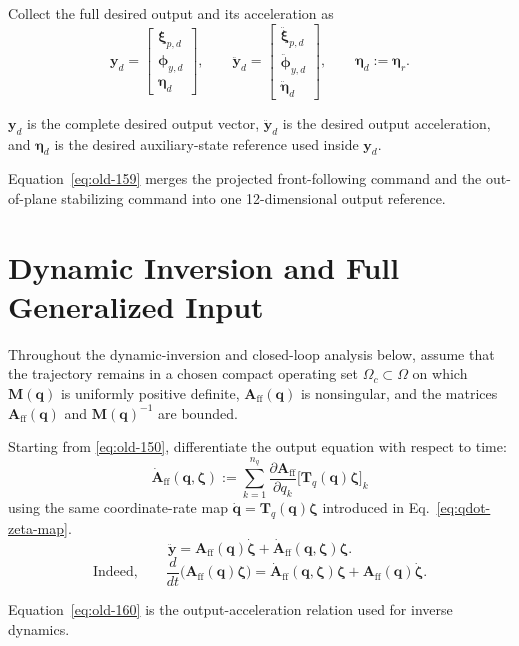 \documentclass[12pt,a4paper]{report}
\newcommand{\newsymbols}[1]{\par\noindent{}#1\par\vspace{0.35em}}
\newcommand{\formulaannotation}[1]{\par\noindent{}#1\par\vspace{0.35em}}
\begin{document}
Collect the full desired output and its acceleration as
\begin{equation}
\mathbf{y}_d =
\begin{bmatrix}
\boldsymbol{\xi}_{p,d} \\
\boldsymbol{\phi}_{y,d} \\
\boldsymbol{\eta}_d
\end{bmatrix},
\qquad
\ddot{\mathbf{y}}_d =
\begin{bmatrix}
\ddot{\boldsymbol{\xi}}_{p,d} \\
\ddot{\boldsymbol{\phi}}_{y,d} \\
\ddot{\boldsymbol{\eta}}_d
\end{bmatrix},
\qquad
\boldsymbol{\eta}_d := \boldsymbol{\eta}_r.
\label{eq:old-159}
\end{equation}
\newsymbols{$\mathbf{y}_d$ is the complete desired output vector, $\ddot{\mathbf{y}}_d$ is the desired output acceleration, and $\boldsymbol{\eta}_d$ is the desired auxiliary-state reference used inside $\mathbf{y}_d$.}
\formulaannotation{Equation~\eqref{eq:old-159} merges the projected front-following command and the out-of-plane stabilizing command into one 12-dimensional output reference.}

\section{Dynamic Inversion and Full Generalized Input}

Throughout the dynamic-inversion and closed-loop analysis below, assume that the trajectory remains in a chosen compact operating set $\Omega_c \subset \Omega$ on which $\mathbf{M}(\mathbf{q})$ is uniformly positive definite, $\mathbf{A}_{\mathrm{ff}}(\mathbf{q})$ is nonsingular, and the matrices $\mathbf{A}_{\mathrm{ff}}(\mathbf{q})$ and $\mathbf{M}(\mathbf{q})^{-1}$ are bounded.

Starting from \eqref{eq:old-150}, differentiate the output equation with respect to time:
\begin{equation}
\dot{\mathbf{A}}_{\mathrm{ff}}(\mathbf{q},\boldsymbol{\zeta})
:=
\sum_{k=1}^{n_q}
\frac{\partial \mathbf{A}_{\mathrm{ff}}}{\partial q_k}
\bigl[\mathbf{T}_{q}(\mathbf{q})\boldsymbol{\zeta}\bigr]_k
\end{equation}
using the same coordinate-rate map $\dot{\mathbf{q}}=\mathbf{T}_{q}(\mathbf{q})\boldsymbol{\zeta}$ introduced in Eq.~\eqref{eq:qdot-zeta-map}.
\begin{equation}
\ddot{\mathbf{y}} =
\mathbf{A}_{\mathrm{ff}}(\mathbf{q}) \dot{\boldsymbol{\zeta}} +
\dot{\mathbf{A}}_{\mathrm{ff}}(\mathbf{q},\boldsymbol{\zeta}) \boldsymbol{\zeta}.
\label{eq:old-160}
\end{equation}
\begin{equation}
\text{Indeed,}\qquad
\frac{d}{dt}\bigl(\mathbf{A}_{\mathrm{ff}}(\mathbf{q})\boldsymbol{\zeta}\bigr)
= \dot{\mathbf{A}}_{\mathrm{ff}}(\mathbf{q},\boldsymbol{\zeta})\boldsymbol{\zeta}
+ \mathbf{A}_{\mathrm{ff}}(\mathbf{q})\dot{\boldsymbol{\zeta}}.
\end{equation}
\formulaannotation{Equation~\eqref{eq:old-160} is the output-acceleration relation used for inverse dynamics.}
\end{document}
